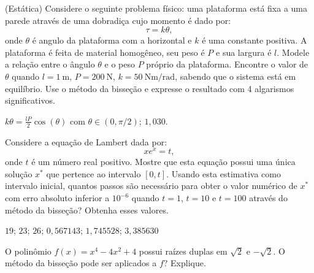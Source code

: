 \begin{exer}(Estática) Considere o seguinte problema físico: uma plataforma está fixa a uma parede através de uma dobradiça cujo momento é dado por:
  \begin{equation*}
    \tau=k\theta,
  \end{equation*}
onde $\theta$ é angulo da plataforma com a horizontal e $k$ é uma constante positiva. A plataforma é feita de material homogêneo, seu peso é $P$ e sua largura é $l$. Modele a relação entre o ângulo $\theta$ e o peso $P$ próprio da plataforma. Encontre o valor de $\theta$ quando $l=1~\mbox{m}$, $P=200~\mbox{N}$, $k=50~\mbox{Nm}/\mbox{rad}$, sabendo que o sistema está em equilíbrio. Use o método da bisseção e expresse o resultado com 4 algarismos significativos.
\end{exer}
\begin{resp}
  
    $k\theta=\frac{lP}{2}\cos(\theta)$ com $\theta\in (0, \pi/2)$; $1,030$.
  
\end{resp}


\begin{exer} Considere a equação de Lambert dada por:
  \begin{equation*}
    xe^x= t,
  \end{equation*}
onde $t$ é um número real positivo. Mostre que esta equação possui uma única solução $x^*$ que pertence ao intervalo $[0, t]$. Usando esta estimativa como intervalo inicial, quantos passos são necessário para obter o valor numérico de $x^*$ com erro absoluto inferior a $10^{-6}$ quando $t=1$, $t=10$ e $t=100$ através do método da bisseção? Obtenha esses valores.
\end{exer}
\begin{resp}
  
    $19$; $23$; $26$; $0,567143$; $1,745528$; $3,385630$
  
\end{resp}

\begin{exer}\label{prob_raiz_dupla} O polinômio $f(x)=x^4-4x^2+4$ possui raízes duplas em $\sqrt{2}$ e $-\sqrt{2}$. O método da bisseção pode ser aplicados a $f$? Explique.
\end{exer}

